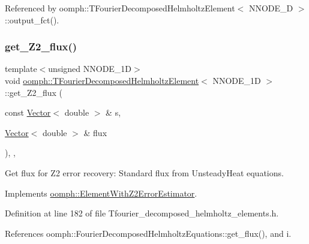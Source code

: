 Referenced by oomph\+::\+T\+Fourier\+Decomposed\+Helmholtz\+Element$<$ N\+N\+O\+D\+E\+\_\+D $>$\+::output\+\_\+fct().

\mbox{\label{classoomph_1_1TFourierDecomposedHelmholtzElement_ab828131d93c8770b52b15d3ddd4deda3}} 
\subsubsection{\texorpdfstring{get\+\_\+\+Z2\+\_\+flux()}{get\_Z2\_flux()}}
{\footnotesize\ttfamily template$<$unsigned N\+N\+O\+D\+E\+\_\+1D$>$ \\
void \hyperlink{classoomph_1_1TFourierDecomposedHelmholtzElement}{oomph\+::\+T\+Fourier\+Decomposed\+Helmholtz\+Element}$<$ N\+N\+O\+D\+E\+\_\+1D $>$\+::get\+\_\+\+Z2\+\_\+flux (\begin{DoxyParamCaption}\item[{const \hyperlink{classoomph_1_1Vector}{Vector}$<$ double $>$ \&}]{s,  }\item[{\hyperlink{classoomph_1_1Vector}{Vector}$<$ double $>$ \&}]{flux }\end{DoxyParamCaption})\hspace{0.3cm}{\ttfamily [inline]}, {\ttfamily [protected]}, {\ttfamily [virtual]}}



Get \textquotesingle{}flux\textquotesingle{} for Z2 error recovery\+: Standard flux from Unsteady\+Heat equations. 



Implements \hyperlink{classoomph_1_1ElementWithZ2ErrorEstimator_a5688ff5f546d81771cabad82ca5a7556}{oomph\+::\+Element\+With\+Z2\+Error\+Estimator}.



Definition at line 182 of file Tfourier\+\_\+decomposed\+\_\+helmholtz\+\_\+elements.\+h.



References oomph\+::\+Fourier\+Decomposed\+Helmholtz\+Equations\+::get\+\_\+flux(), and i.

\mbox{\label{classoomph_1_1TFourierDecomposedHelmholtzElement_a6689b57135220a2e5a5b8dc275b6510a}} 
